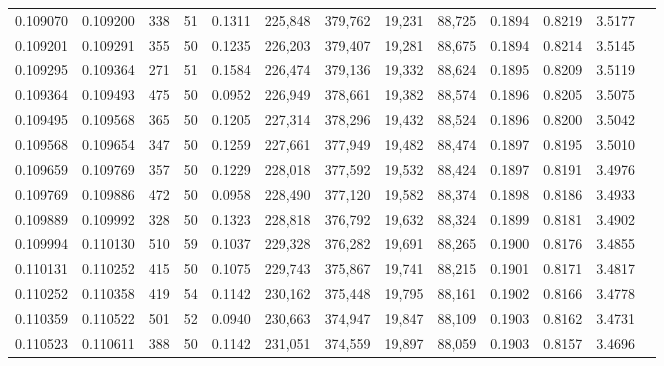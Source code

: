 \begin{tabular}{rrrrrrrrrrrrr}
0.109070 & 0.109200 &   338 &  51 &                                     0.1311 & 225,848 & 379,762 &  19,231 &  88,725 & 0.1894 & 0.8219 & 3.5177 \\
0.109201 & 0.109291 &   355 &  50 &                                     0.1235 & 226,203 & 379,407 &  19,281 &  88,675 & 0.1894 & 0.8214 & 3.5145 \\
0.109295 & 0.109364 &   271 &  51 &                                     0.1584 & 226,474 & 379,136 &  19,332 &  88,624 & 0.1895 & 0.8209 & 3.5119 \\
0.109364 & 0.109493 &   475 &  50 &                                     0.0952 & 226,949 & 378,661 &  19,382 &  88,574 & 0.1896 & 0.8205 & 3.5075 \\
0.109495 & 0.109568 &   365 &  50 &                                     0.1205 & 227,314 & 378,296 &  19,432 &  88,524 & 0.1896 & 0.8200 & 3.5042 \\
0.109568 & 0.109654 &   347 &  50 &                                     0.1259 & 227,661 & 377,949 &  19,482 &  88,474 & 0.1897 & 0.8195 & 3.5010 \\
0.109659 & 0.109769 &   357 &  50 &                                     0.1229 & 228,018 & 377,592 &  19,532 &  88,424 & 0.1897 & 0.8191 & 3.4976 \\
0.109769 & 0.109886 &   472 &  50 &                                     0.0958 & 228,490 & 377,120 &  19,582 &  88,374 & 0.1898 & 0.8186 & 3.4933 \\
0.109889 & 0.109992 &   328 &  50 &                                     0.1323 & 228,818 & 376,792 &  19,632 &  88,324 & 0.1899 & 0.8181 & 3.4902 \\
0.109994 & 0.110130 &   510 &  59 &                                     0.1037 & 229,328 & 376,282 &  19,691 &  88,265 & 0.1900 & 0.8176 & 3.4855 \\
0.110131 & 0.110252 &   415 &  50 &                                     0.1075 & 229,743 & 375,867 &  19,741 &  88,215 & 0.1901 & 0.8171 & 3.4817 \\
0.110252 & 0.110358 &   419 &  54 &                                     0.1142 & 230,162 & 375,448 &  19,795 &  88,161 & 0.1902 & 0.8166 & 3.4778 \\
0.110359 & 0.110522 &   501 &  52 &                                     0.0940 & 230,663 & 374,947 &  19,847 &  88,109 & 0.1903 & 0.8162 & 3.4731 \\
0.110523 & 0.110611 &   388 &  50 &                                     0.1142 & 231,051 & 374,559 &  19,897 &  88,059 & 0.1903 & 0.8157 & 3.4696 \\

\end{tabular}
